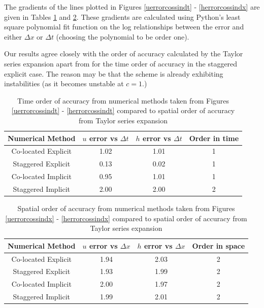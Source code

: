 \documentclass[a4paper, 10.5pt, notitlepage]{article}
\begin{document}
The gradients of the lines plotted in Figures \ref{uerrorcossindt} - \ref{herrorcossindx}  are given in Tables \ref{gradientdt} and \ref{gradientdx}. These gradients are calculated using Python's least square polynomial fit function on the log relationships between the error and either $\Delta x$ or $\Delta t$ (choosing the polynomial to be order one). 

Our results agree closely with the order of accuracy calculated by the Taylor series expansion apart from for the time order of accuracy in the staggered explicit case. The reason may be that the scheme is already exhibiting instabilities (as it becomes unstable at $c = 1$.)


\begin{table}[H]
	\centering
	\begin{tabular}{|c | c| c| c|} 
		\hline
		\textbf{Numerical Method}  & $u$ error vs $\Delta t$ & $h$ error vs $\Delta t$ & Order in time \\
		\hline
		Co-located Explicit & 1.02 & 1.01 & 1\\ 
		\hline
		Staggered Explicit & 0.13 & 0.02 & 1\\
		\hline
		Co-located Implicit & 0.95 & 1.01 & 1\\
		\hline
		Staggered Implicit & 2.00 & 2.00 & 2\\
		\hline
	\end{tabular}
	\caption{Time order of accuracy from numerical methods taken from Figures \ref{uerrorcossindt} - \ref{herrorcossindt} compared to spatial order of accuracy from Taylor series expansion}
	\label{gradientdt}
\end{table}

\begin{table}[H]
	\centering
	\begin{tabular}{|c | c| c| c|} 
		\hline
		\textbf{Numerical Method} & $u$ error vs $\Delta x$ &  $h$ error vs $\Delta x$ & Order in space\\
		\hline
		Co-located Explicit & 1.94 & 2.03 & 2 \\ 
		\hline
		Staggered Explicit & 1.93 & 1.99 & 2 \\
		\hline
		Co-located Implicit & 2.00 & 1.97 & 2 \\
		\hline
		Staggered Implicit & 1.99 & 2.01 & 2 \\
		\hline
	\end{tabular}
	\caption{Spatial order of accuracy from numerical methods taken from Figures \ref{uerrorcossindx} - \ref{herrorcossindx} compared to spatial order of accuracy from Taylor series expansion}
	\label{gradientdx}
\end{table}
\end{document}
